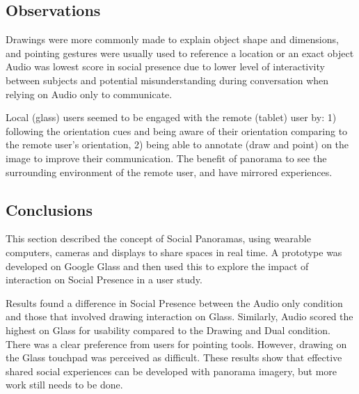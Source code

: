 \subsection{Observations}

Drawings were more commonly made to explain object shape and dimensions, and pointing gestures were usually used to reference a location or an exact object Audio was lowest score in social presence due to lower level of interactivity between subjects and potential misunderstanding during conversation when relying on Audio only to communicate. 

Local (glass) users seemed to be engaged with the remote (tablet) user by: 1) following the orientation cues and being aware of their orientation comparing to the remote user's orientation, 2) being able to annotate (draw and point) on the image to improve their communication. The benefit of panorama to see the surrounding environment of the remote user, and have mirrored experiences.

\subsection{Conclusions}

This section described the concept of Social Panoramas, using wearable computers, cameras and displays to share spaces in real time. A prototype was developed on Google Glass and then used this to explore the impact of interaction on Social Presence in a user study. 

Results found a difference in Social Presence between the Audio only condition and those that involved drawing interaction on Glass. Similarly, Audio scored the highest on Glass for usability compared to the Drawing and Dual condition. There was a clear preference from users for pointing tools. However, drawing on the Glass touchpad was perceived as difficult. These results show that effective shared social experiences can be developed with panorama imagery, but more work still needs to be done.


